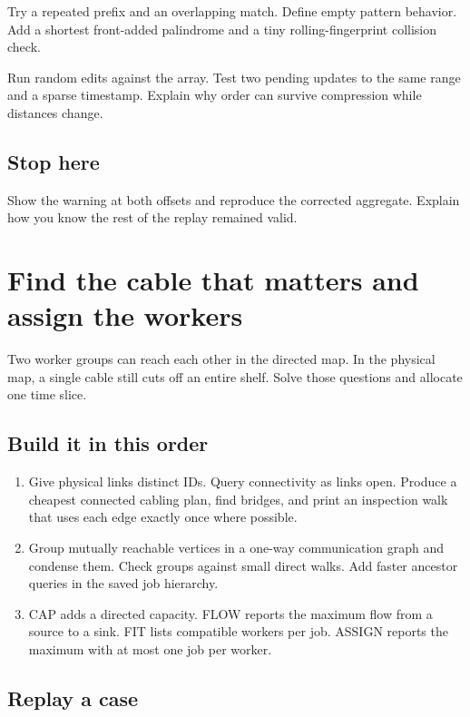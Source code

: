 \documentclass[11pt,letterpaper]{article}
\begin{document}
Try a repeated prefix and an overlapping match. Define empty pattern behavior. Add a shortest front-added palindrome and a tiny rolling-fingerprint collision check.

Run random edits against the array. Test two pending updates to the same range and a sparse timestamp. Explain why order can survive compression while distances change.

\subsection*{Stop here}

Show the warning at both offsets and reproduce the corrected aggregate. Explain how you know the rest of the replay remained valid.

\clearpage

\section{Find the cable that matters and assign the workers}\label{datacenter:08}

Two worker groups can reach each other in the directed map. In the physical map, a single cable still cuts off an entire shelf. Solve those questions and allocate one time slice.

\subsection*{Build it in this order}

\begin{enumerate}
\item Give physical links distinct IDs. Query connectivity as links open. Produce a cheapest connected cabling plan, find bridges, and print an inspection walk that uses each edge exactly once where possible.
\item Group mutually reachable vertices in a one-way communication graph and condense them. Check groups against small direct walks. Add faster ancestor queries in the saved job hierarchy.
\item CAP adds a directed capacity. FLOW reports the maximum flow from a source to a sink. FIT lists compatible workers per job. ASSIGN reports the maximum with at most one job per worker.
\end{enumerate}

\subsection*{Replay a case}
\end{document}
